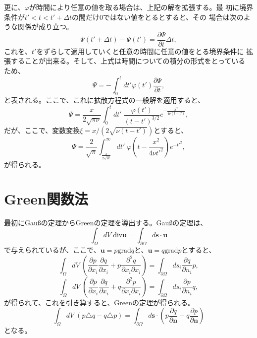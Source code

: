更に、$\varphi$が時間により任意の値を取る場合は、上記の解を拡張する。最
初に境界条件が$t'<t<t'+\Delta t$の間だけ0ではない値をとるとすると、その
場合は次のような関係が成り立つ。
\begin{equation}
 \Psi (t'+\Delta t) - \Psi (t') = \frac{\partial \Psi}{\partial t}\Delta t,
\end{equation}
これを、$t'$をずらして適用していくと任意の時間に任意の値をとる境界条件に
拡張することが出来る。そして、上式は時間についての積分の形式をとっている
ため、
\begin{equation}
 \Psi = -\int_{0}^{t}dt' \varphi(t')\frac{\partial \Psi}{\partial t},
\end{equation}
と表される。ここで、これに拡散方程式の一般解を適用すると、
\begin{equation}
 \Psi = \frac{x}{2\sqrt{\pi\nu}} \int_{0}^{t}dt'\mspace{5mu}
  \frac{\varphi(t')}{(t-t')^{3/2}}e^{-\frac{x^2}{4\nu(t-t')}},
\end{equation}
だが、ここで、変数変換$\xi=x/(2\sqrt{\nu(t-t')})$とすると、
\begin{equation}
 \Psi = \frac{2}{\sqrt{\pi}}\int_{\frac{x}{2\sqrt{\nu t}}}^{\infty}dt'\mspace{5mu}
  \varphi\left(t-\frac{x^2}{4\nu t'^2}\right)e^{-t'^2},
\end{equation}
が得られる。

\section{Green関数法}
最初にGau\ss の定理からGreenの定理を導出する。Gau\ss の定理は、
\begin{equation}
 \int_{\Omega}dV\mspace{5mu}\text{div}\bm{u}
  =  \int_{\partial\Omega}d\bm{s}\cdot\bm{u}
\end{equation}
で与えられているが、ここで、$\bm{u}=p\text{grad}q$と、$\bm{u}=q\text{grad}p$とすると、
\begin{equation}
  \int_{\Omega}dV\mspace{5mu}
   \left(\frac{\partial p}{\partial x_i}\frac{\partial q}{\partial x_i}+p\frac{\partial^2q}{\partial x_i\partial x_i}\right)
  =  \int_{\partial\Omega}ds_i\frac{\partial q}{\partial n_i}p,
\end{equation}
\begin{equation}
  \int_{\Omega}dV\mspace{5mu}
   \left(\frac{\partial p}{\partial x_i}\frac{\partial q}{\partial x_i}+q\frac{\partial^2p}{\partial x_i\partial x_i}\right)
  =  \int_{\partial\Omega}ds_i\frac{\partial p}{\partial n_i}q,
\end{equation}
が得られて、これを引き算すると、Greenの定理が得られる。
\begin{equation}
  \int_{\Omega}dV\mspace{5mu}\left(p\triangle q - q\triangle p\right)
  =  \int_{\partial\Omega}d\bm{s}\cdot
  \left(p\frac{\partial q}{\partial \bm{n}}-q\frac{\partial p}{\partial \bm{n}}\right)
\end{equation}
となる。

